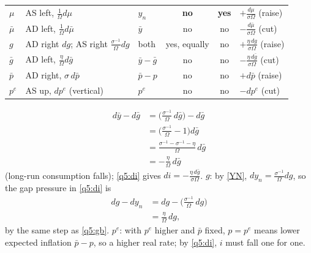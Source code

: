 \begin{sol}
\begin{center}
\begin{tabular}{lllccl}
$\mu$ & AS left, $\frac{1}{\Omega}d\mu$ & $y_n$ & \textbf{no} & \textbf{yes} & $+\frac{d\mu}{\sigma\Omega}$ (raise) \\
$\bar\mu$ & AD left, $\frac{1}{\Omega}d\bar\mu$ & $\bar y$ & no & no & $-\frac{d\bar\mu}{\sigma\Omega}$ (cut) \\
$g$ & AD right $dg$; AS right $\frac{\sigma^{-1}}{\Omega}dg$ & both & yes, equally & no & $+\frac{\eta\,dg}{\sigma\Omega}$ (raise) \\
$\bar g$ & AD left, $\frac{\eta}{\Omega}d\bar g$ & $\bar y-\bar g$ & no & no & $-\frac{\eta\,d\bar g}{\sigma\Omega}$ (cut) \\
$\bar p$ & AD right, $\sigma\,d\bar p$ & $\bar p-p$ & no & no & $+d\bar p$ (raise) \\
$p^e$ & AS up, $dp^e$ (vertical) & $p^e$ & no & no & $-dp^e$ (cut) \\
\bottomrule
\end{tabular}
\end{center}
\begin{align}
d\bar y-d\bar g&=\Big(\frac{\sigma^{-1}}{\Omega}\,d\bar g\Big)-d\bar g\nonumber\\
&=\Big(\frac{\sigma^{-1}}{\Omega}-1\Big)d\bar g\nonumber\\
&=\frac{\sigma^{-1}-\sigma^{-1}-\eta}{\Omega}\,d\bar g\nonumber\\
&=-\frac{\eta}{\Omega}\,d\bar g \label{q5:gb}
\end{align}
(long-run consumption falls); \eqref{q5:di} gives $di=-\frac{\eta\,d\bar g}{\sigma\Omega}$. $g$: by \eqref{YN}, $dy_n=\frac{\sigma^{-1}}{\Omega}dg$, so the gap pressure
in \eqref{q5:di} is
\begin{align}
dg-dy_n&=dg-\Big(\frac{\sigma^{-1}}{\Omega}\,dg\Big)\nonumber\\
&=\frac{\eta}{\Omega}\,dg , \nonumber
\end{align}
by the same step as \eqref{q5:gb}. $p^e$: with $p^e$ higher and $\bar p$ fixed, $p=p^e$ means lower expected inflation $\bar p-p$, so a
higher real rate; by \eqref{q5:di}, $i$ must fall one for one.
\end{sol}

